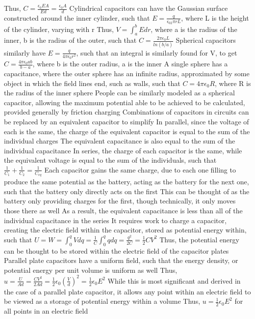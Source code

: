 \documentclass[11 pt, twoside]{article}
\newenvironment{outline*}
{
	\begin{outline}[enumerate]
	}
	{\end{outline}
}
\begin{document}
\begin{outline*}
\2 Thus, $C = \frac{\epsilon_0EA}{Ed} = \frac{\epsilon_0A}{d}$
\2 Cylindrical capacitors can have the Gaussian surface constructed around the inner cylinder, such that $E = \frac{q}{\epsilon_02\pi rL}$, where L is the height of the cylinder, varying with r
\3 Thus, $V = \int^b_a Edr$, where a is the radius of the inner, b is the radius of the outer, such that $C = \frac{2\pi\epsilon_0L}{ln(b/a)}$
\2 Spherical capacitors similarly have $E = \frac{q}{4\pi\epsilon_0r^2}$, such that an integral is similarly found for V, to get $C = \frac{4\pi\epsilon_0ab}{b-a}$, where b is the outer radius, a is the inner
\3 A single sphere has a capacitance, where the outer sphere has an infinite radius, approximated by some object in which the field lines end, such as walls, such that $C = 4\pi\epsilon_0R$, where R is the radius of the inner sphere
\4 People can be similarly modeled as a spherical capacitor, allowing the maximum potential able to be achieved to be calculated, provided generally by friction charging
\1 Combinations of capacitors in circuits can be replaced by an equivalent capacitor to simplify
\2 In parallel, since the voltage of each is the same, the charge of the equivalent capacitor is equal to the sum of the individual charges
\3 The equivalent capacitance is also equal to the sum of the individual capacitance
\2 In series, the charge of each capacitor is the same, while the equivalent voltage is equal to the sum of the individuals, such that $\frac{1}{C_1} + \frac{1}{C_2} = \frac{1}{C_{eq}}$
\3 Each capacitor gains the same charge, due to each one filling to produce the same potential as the battery, acting as the battery for the next one, such that the battery only directly acts on the first
\4 This can be thought of as the battery only providing charges for the first, though technically, it only moves those there as well
\3 As a result, the equivalent capacitance is less than all of the individual capacitance in the series
\1 It requires work to charge a capacitor, creating the electric field within the capacitor, stored as potential energy within, such that $U = W = \int^q_0 Vdq = \frac{1}{C} \int^q_0 qdq = \frac{q^2}{2C} = \frac{1}{2}CV^2$
\2 Thus, the potential energy can be thought to be stored within the electric field of the capacitor plates
\2 Parallel plate capacitors have a uniform field, such that the energy density, or potential energy per unit volume is uniform as well
\3 Thus, $u = \frac{U}{Ad} = \frac{CV^2}{2Ad} = \frac{1}{2}\epsilon_0(\frac{V}{d})^2 = \frac{1}{2}\epsilon_0E^2$
\3 While this is most significant and derived in the case of a parallel plate capacitor, it allows any point within an electric field to be viewed as a storage of potential energy within a volume
\3 Thus, $u = \frac{1}{2}\epsilon_0E^2$ for all points in an electric field
\end{outline*}
\end{document}
